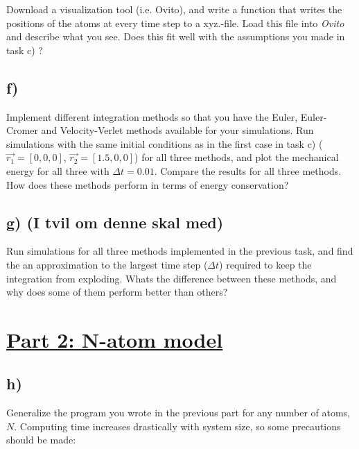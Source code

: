 \documentclass[11pt,british,a4paper]{report}
\begin{document}
Download a visualization tool (i.e. Ovito), and write a function that writes the positions of the atoms at every time step to a xyz.-file. Load this file into \textit{Ovito} and describe
what you see. Does this fit well with the assumptions you made in task c) ?

\subsection*{f)}

Implement different integration methods so that you have the Euler, Euler-Cromer and Velocity-Verlet methods available for your simulations. Run simulations with the same initial conditions
as in the first case in task c) ($\vec{r_1} = [0, 0, 0]$, $\vec{r_2} = [1.5, 0, 0]$) for all three methods, and plot the mechanical energy for all three with $\Delta t = 0.01$. Compare
the results for all three methods. How does these methods perform in terms of energy conservation?

\subsection*{g) (I tvil om denne skal med)}

Run simulations for all three methods implemented in the previous task, and find the an approximation to the largest time step ($\Delta t$) required to keep the integration from exploding.
Whats the difference between these methods, and why does some of them perform better than others?



\section*{\underline{Part 2: N-atom model}}

\subsection*{h)}

Generalize the program you wrote in the previous part for any number of atoms, $N$. Computing time increases drastically with system size, so some precautions should be made:
\end{document}
